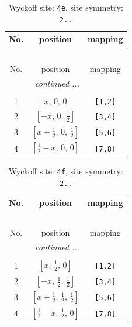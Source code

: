 \documentclass[fleqn,8pt]{jsarticle}
\begin{document}
\begin{longtable}{ccc}
\caption{Wyckoff site: {\tt 4e}, site symmetry: {\tt 2..}}
 \\
 \hline \hline
No. & position & mapping \\ \hline \endfirsthead

\multicolumn{2}{l}{\tablename\ \thetable{}} \\
 \hline \hline
No. & position & mapping \\ \hline \endhead

 \hline \hline
\multicolumn{2}{r}{\footnotesize\it continued ...} \\ \endfoot

 \hline \hline
\multicolumn{2}{r}{} \\ \endlastfoot

1 & $\left[ x,\, 0,\, 0 \right]$ & {\tt [1,2]} \\ \hline
2 & $\left[ - x,\, 0,\, \frac{1}{2} \right]$ & {\tt [3,4]} \\ \hline
3 & $\left[ x + \frac{1}{2},\, 0,\, \frac{1}{2} \right]$ & {\tt [5,6]} \\ \hline
4 & $\left[ \frac{1}{2} - x,\, 0,\, 0 \right]$ & {\tt [7,8]} \\
\end{longtable}
\renewcommand{\arraystretch}{1.2}
\begin{longtable}{ccc}
\caption{Wyckoff site: {\tt 4f}, site symmetry: {\tt 2..}}
 \\
 \hline \hline
No. & position & mapping \\ \hline \endfirsthead

\multicolumn{2}{l}{\tablename\ \thetable{}} \\
 \hline \hline
No. & position & mapping \\ \hline \endhead

 \hline \hline
\multicolumn{2}{r}{\footnotesize\it continued ...} \\ \endfoot

 \hline \hline
\multicolumn{2}{r}{} \\ \endlastfoot

1 & $\left[ x,\, \frac{1}{2},\, 0 \right]$ & {\tt [1,2]} \\ \hline
2 & $\left[ - x,\, \frac{1}{2},\, \frac{1}{2} \right]$ & {\tt [3,4]} \\ \hline
3 & $\left[ x + \frac{1}{2},\, \frac{1}{2},\, \frac{1}{2} \right]$ & {\tt [5,6]} \\ \hline
4 & $\left[ \frac{1}{2} - x,\, \frac{1}{2},\, 0 \right]$ & {\tt [7,8]} \\
\end{longtable}
\end{document}
